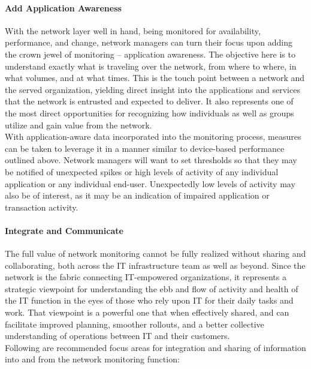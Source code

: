 \documentclass[8pt]{extarticle}
\begin{document}
\begin{multicols}{3}
\paragraph{Add Application Awareness}
With the network layer well in hand, being monitored for availability, performance, and change,
network managers can turn their focus upon adding the crown jewel of monitoring – application
awareness. The objective here is to understand exactly what is traveling over the network, from where to
where, in what volumes, and at what times. This is the touch point between a network and the served
organization, yielding direct insight into the applications and services that the network is entrusted and
expected to deliver. It also represents one of the most direct opportunities
for recognizing how individuals as well as groups utilize and gain value
from the network. \\
With application-aware data incorporated into the monitoring process, measures can be taken to
leverage it in a manner similar to device-based performance outlined above. Network managers will
want to set thresholds so that they may be notified of unexpected spikes or high levels of activity of any
individual application or any individual end-user. Unexpectedly low levels of activity may also be of
interest, as it may be an indication of impaired application or transaction activity.
\paragraph{Integrate and Communicate}
The full value of network monitoring cannot be fully realized without sharing and collaborating,
both across the IT infrastructure team as well as beyond. Since the network is the fabric connecting
IT-empowered organizations, it represents a strategic viewpoint for understanding the ebb and flow of
activity and health of the IT function in the eyes of those who rely upon IT for their daily tasks and work.
That viewpoint is a powerful one that when effectively shared, and can facilitate improved planning,
smoother rollouts, and a better collective understanding of operations between IT and their customers. \\
Following are recommended focus areas for integration and sharing of information into and from the network 
monitoring function:


\end{multicols}
\end{document}
